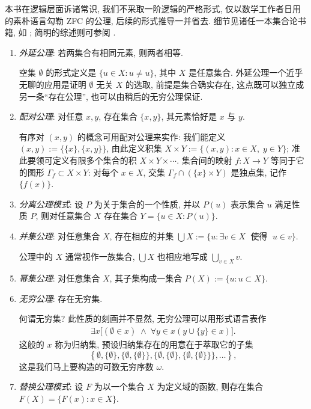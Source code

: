 本书在逻辑层面诉诸常识, 我们不采取一阶逻辑的严格形式, 仅以数学工作者日用的素朴语言勾勒 ZFC 的公理, 后续的形式推导一并省去. 细节见诸任一本集合论书籍, 如 \cite{Je03,HY14}; 简明的综述则可参阅 \cite{sep-set-theory}.
\begin{enumerate}[\bfseries {A}.1]
	\item \emph{外延公理}: 若两集合有相同元素, 则两者相等.

		空集 $\emptyset$ 的形式定义是 $\{u \in X: u \neq u\}$, 其中 $X$ 是任意集合. 外延公理一个近乎无聊的应用是证明 $\emptyset$ 无关 $X$ 的选取, 前提是集合确实存在, 这点既可以独立成另一条``存在公理'', 也可以由稍后的无穷公理保证.
	\item \emph{配对公理}: 对任意 $x,y$, 存在集合 $\{x,y\}$, 其元素恰好是 $x$ 与 $y$.
	
		有序对 $(x,y)$ 的概念可用配对公理来实作: 我们能定义 $(x,y) := \{\{x\}, \{x,y\} \}$, 由此定义积集 $X \times Y := \{(x,y) : x \in X,\; y \in Y \}$; 准此要领可定义有限多个集合的积 $X \times Y \times \cdots$. 集合间的映射 $f: X \to Y$ 等同于它的图形 $\Gamma_f \subset X \times Y$: 对每个 $x \in X$, 交集 $\Gamma_f \cap (\{x\} \times Y)$ 是独点集, 记作 $\{f(x)\}$.
	\item \emph{分离公理模式}: 设 $P$ 为关于集合的一个性质, 并以 $P(u)$ 表示集合 $u$ 满足性质 $P$, 则对任意集合 $X$ 存在集合 $Y = \{u \in X : P(u) \}$.
	\item \emph{并集公理}:  对任意集合 $X$, 存在相应的并集 $\bigcup X := \{u : \exists v \in X \; \text{ 使得 }\; u \in v\}$.
	
		公理中的 $X$ 通常视作一族集合, $\bigcup X$ 也相应地写成 $\bigcup_{v \in X} v$.
	\item \emph{幂集公理}: 对任意集合 $X$, 其子集构成一集合 $P(X) := \{u : u \subset X \}$.
	\item \emph{无穷公理}: 存在无穷集.

		何谓无穷集? 此性质的刻画并不显然, 无穷公理可以用形式语言表作
		\begin{gather}\label{eqn:infinity-axiom}
			\exists x \bigl[ (\emptyset \in x) \;\wedge \;\forall y \in x \left(y \cup \{y\} \in x \right)  \bigr].
		\end{gather}
		这般的 $x$ 称为归纳集, 预设归纳集存在的用意在于萃取它的子集
		\[ \left\{\emptyset, \{\emptyset\}, \{  \emptyset, \{\emptyset\}\}, \{  \emptyset, \{\emptyset\}, \{  \emptyset, \{\emptyset\}\}\}, \ldots \right\}, \]
		这是我们马上要构造的可数无穷序数 $\omega$.
	\item \emph{替换公理模式}: 设 $F$ 为以一个集合 $X$ 为定义域的函数, 则存在集合 $F(X) = \{ F(x) : x \in X\}$.
	

\end{enumerate}
